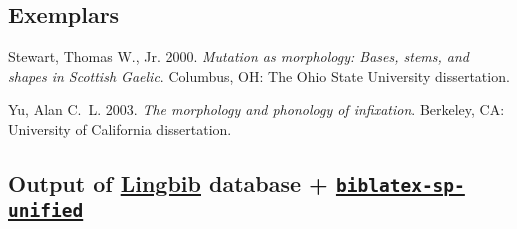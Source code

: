\documentclass{article}
\newcommand*{\Lingbib}{\href{http://lingbib.org/}{Lingbib}}
\newcommand*{\SPUnified}{\href{https://github.com/semprag/biblatex-sp-unified/}{\Package{biblatex-sp-unified}}}
\newcommand*{\Package}[1]{\texttt{#1}}
\begin{document}
\subsection{Exemplars}

\begin{hangparas}{15pt}{1}

Stewart, Thomas W., Jr. 2000. \textit{Mutation as morphology: Bases, stems, and shapes in Scottish Gaelic}. Columbus, OH: The Ohio State University dissertation.

Yu, Alan C.~L. 2003. \textit{The morphology and phonology of infixation}. Berkeley, CA: University of California dissertation.

\end{hangparas}

\subsection{Output of \Lingbib{} database + \SPUnified}

\nocite{munn1993:coordinate}

\printbibliography[
	heading=none
]
\end{document}
